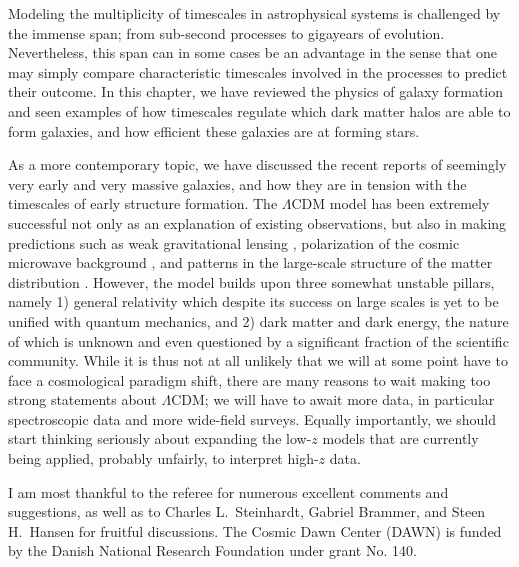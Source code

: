 \documentclass[useAMS]{aa}
\begin{document}
Modeling the multiplicity of timescales in astrophysical systems is challenged by the immense span; from sub-second processes to gigayears of evolution.
Nevertheless, this span can in some cases be an advantage in the sense that one may simply compare characteristic timescales involved in the processes to predict their outcome.
In this chapter, we have reviewed the physics of galaxy formation and seen examples of how timescales regulate which dark matter halos are able to form galaxies, and how efficient these galaxies are at forming stars.

As a more contemporary topic, we have discussed the recent reports of seemingly very early and very massive galaxies, and how they are in tension with the timescales of early structure formation.
The $\Lambda$CDM model has been extremely successful not only as an explanation of existing observations, but also in making predictions such as weak gravitational lensing \citep{Fischer2000}, polarization of the cosmic microwave background \citep{Kovac2002}, and patterns in the large-scale structure of the matter distribution
\citep{Eisenstein2005}.
However, the model builds upon three somewhat unstable pillars, namely 1) general relativity which despite its success on large scales is yet to be unified with quantum mechanics, and 2) dark matter and dark energy, the nature of which is unknown and even questioned by a significant fraction of the scientific community.
While it is thus not at all unlikely that we will at some point have to face a cosmological paradigm shift, there are many reasons to wait making too strong statements about $\Lambda$CDM; we will have to await more data, in particular spectroscopic data and more wide-field surveys.
Equally importantly, we should start thinking seriously about expanding the low-$z$ models that are currently being applied, probably unfairly, to interpret high-$z$ data.

\begin{center}
\end{center}

\begin{acknowledgements}
    I am most thankful to the referee for numerous excellent comments and suggestions, as well as to Charles L.~Steinhardt, Gabriel Brammer, and Steen H.~Hansen for fruitful discussions.
    The Cosmic Dawn Center (DAWN) is funded by the Danish National Research Foundation under grant No. 140.
\end{acknowledgements}



\end{document}
